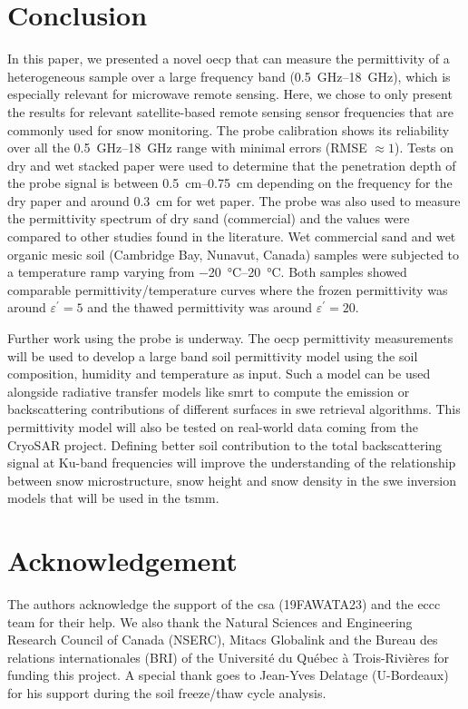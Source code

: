 \section{Conclusion}
In this paper, we presented a novel \acl{oecp} that can measure the permittivity of a heterogeneous sample over a large frequency band (\qtyrange{0.5}{18}{\giga\hertz}), which is especially relevant for microwave remote sensing.
Here, we chose to only present the results for relevant satellite-based remote sensing sensor frequencies that are commonly used for snow monitoring.
The probe calibration shows its reliability over all the \qtyrange{0.5}{18}{\giga\hertz} range with minimal errors (RMSE \(\approx1\)).
Tests on dry and wet stacked paper were used to determine that the penetration depth of the probe signal is between \qtyrange{0.5}{0.75}{\cm} depending on the frequency for the dry paper and around \qty{0.3}{\cm} for wet paper.
The probe was also used to measure the permittivity spectrum of dry sand (commercial) and the values were compared to other studies found in the literature.
Wet commercial sand and wet organic mesic soil (Cambridge Bay, Nunavut, Canada) samples were subjected to a temperature ramp varying from \qtyrange{-20}{20}{\degreeCelsius}.
Both samples showed comparable permittivity/temperature curves where the frozen permittivity was around \(\varepsilon^\prime = 5\) and the thawed permittivity was around \(\varepsilon^\prime = 20\).

Further work using the probe is underway.
The \ac{oecp} permittivity measurements will be used to develop a large band soil permittivity model using the soil composition, humidity and temperature as input.
Such a model can be used alongside radiative transfer models like \acl{smrt} to compute the emission or backscattering contributions of different surfaces in \acl{swe} retrieval algorithms.
This permittivity model will also be tested on real-world data coming from the CryoSAR project.
Defining better soil contribution to the total backscattering signal at Ku-band frequencies will improve the understanding of the relationship between snow microstructure, snow height and snow density in the \ac{swe} inversion models that will be used in the \acl{tsmm}.

\section{Acknowledgement}
The authors acknowledge the support of the \acl{csa} (19FAWATA23) and the \acl{eccc} team for their help.
We also thank the Natural Sciences and Engineering Research Council of Canada (NSERC), Mitacs Globalink and the Bureau des relations internationales (BRI) of the Université du Québec à Trois-Rivières for funding this project. 
A special thank goes to Jean-Yves Delatage (U-Bordeaux) for his support during the soil freeze/thaw cycle analysis.
